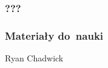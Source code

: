 \documentclass[10pt,t]{beamer}
\begin{document}
\begin{frame}
  \frametitle{???}




\end{frame}





\begin{frame}
  \frametitle{Materiały do~nauki}


  Ryan Chadwick
  \parencite{Chadwick-BASH-Scripting-Tutorial-Introduction-ETC-Ver-2025}

\end{frame}




























\end{document}
